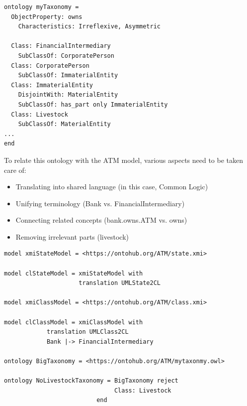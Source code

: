 \documentclass[10pt,fleqn,final]{scrreprt}
\newcommand{\cbs}[0]{\color{red}\xspace} %
\newcommand{\cbe}[0]{\color{black}\xspace} %
\newenvironment{definitions}[0]{\medskip }{}
\begin{document}
\begin{definitions}
\begin{lstlisting}[basicstyle=\ttfamily,language=dolText,morekeywords={props,ObjectProperty,Class,DisjointUnionOf,SubClassOf,DisjointWith, Irreflexive, Characteristics,Transitive,Asymmetric,SubPropertyOf,DisjointClasses,EquivalentTo,inverse,only,forall,iff,if,or,exists,sort,ops,in,approximate,extract},escapechar=@,mathescape]
ontology myTaxonomy =
  ObjectProperty: owns 
    Characteristics: Irreflexive, Asymmetric

  Class: FinancialIntermediary
    SubClassOf: CorporatePerson 
  Class: CorporatePerson
    SubClassOf: ImmaterialEntity
  Class: ImmaterialEntity
    DisjointWith: MaterialEntity
    SubClassOf: has_part only ImmaterialEntity
  Class: Livestock 	
    SubClassOf: MaterialEntity 
...
end
\end{lstlisting}

\cbs To relate this ontology with the ATM model, 
various aspects need to be taken care of:\cbe
\begin{itemize}
  \item Translating into shared language \cbs (in this case, Common Logic)\cbe
  \item Unifying terminology (Bank vs. FinancialIntermediary)
  \item Connecting related concepts (bank.owns.ATM vs. owns)
  \item Removing irrelevant parts (livestock) 
\end{itemize}

\begin{lstlisting}[basicstyle=\ttfamily\small,language=dolText,morekeywords={props,ObjectProperty,Class,DisjointUnionOf,SubClassOf,DisjointWith, OMS, Characteristics,Transitive,Asymmetric,translation,SubPropertyOf,DisjointClasses,EquivalentTo,inverse,only,forall,iff,if,or,exists,sort,ops,in,approximate,extract,oms,model},escapechar=@,mathescape]
model xmiStateModel = <https://ontohub.org/ATM/state.xmi>

model clStateModel = xmiStateModel with
                     translation UMLState2CL

model xmiClassModel = <https://ontohub.org/ATM/class.xmi>			

model clClassModel = xmiClassModel with 
            translation UMLClass2CL 
            Bank |-> FinancialIntermediary

ontology BigTaxonomy = <https://ontohub.org/ATM/mytaxonmy.owl>			

ontology NoLivestockTaxonomy = BigTaxonomy reject
                               Class: Livestock
						  end


\end{lstlisting}
\end{definitions}
\end{document}
